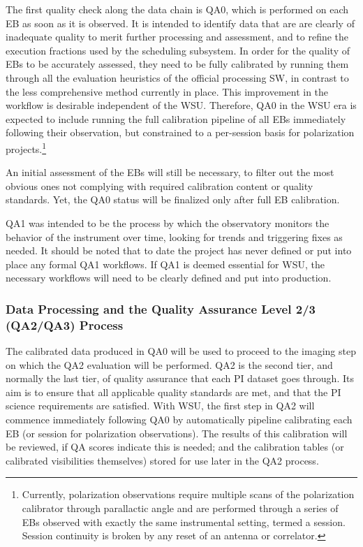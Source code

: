 The first quality check along the data chain is QA0, which is performed on each EB as soon as it is observed.  It is intended to identify data that are are clearly of inadequate quality to merit further processing and assessment, and to refine the execution fractions used by the scheduling subsystem. In order for the quality of EBs to be accurately assessed, they need to be fully calibrated by running them through all the evaluation heuristics of the official processing SW, in contrast to the less comprehensive method currently in place. This improvement in the workflow is desirable independent of the WSU.
Therefore, QA0 in the WSU era is expected to include running the full calibration pipeline of all EBs immediately following their observation, but constrained to a per-session basis for polarization projects.\footnote{Currently, polarization observations require multiple scans of the polarization calibrator through parallactic angle and are performed through a series of EBs observed with exactly the same instrumental setting, termed a session. Session continuity is broken by any reset of an antenna or correlator.} 

An initial assessment of the EBs will still be necessary, to filter out the most obvious ones not complying with required calibration content or quality standards. Yet, the QA0 status will be finalized only after full EB calibration. %


QA1 was intended to be the process by which the observatory monitors the behavior of the instrument over time, looking for trends and triggering fixes as needed. It should be noted that to date the project has never defined or put into place any formal QA1 workflows. If QA1 is deemed essential for WSU, the necessary workflows will need to be clearly defined and put into production.

\subsubsection{Data Processing and the Quality Assurance Level 2/3 (QA2/QA3) Process}
The calibrated data produced in QA0 will be used to proceed to the imaging step on which the QA2 evaluation will be performed. QA2 is the second tier, and normally the last tier, of quality assurance that each PI dataset goes through. Its aim is to ensure that all applicable quality standards are met, and that the PI science requirements are satisfied. With WSU, the first step in QA2 will commence immediately following QA0 by automatically pipeline calibrating each EB (or session for polarization observations). The results of this calibration will be reviewed, if QA scores indicate this is needed; and the calibration tables (or calibrated visibilities themselves) stored for use later in the QA2 process.

